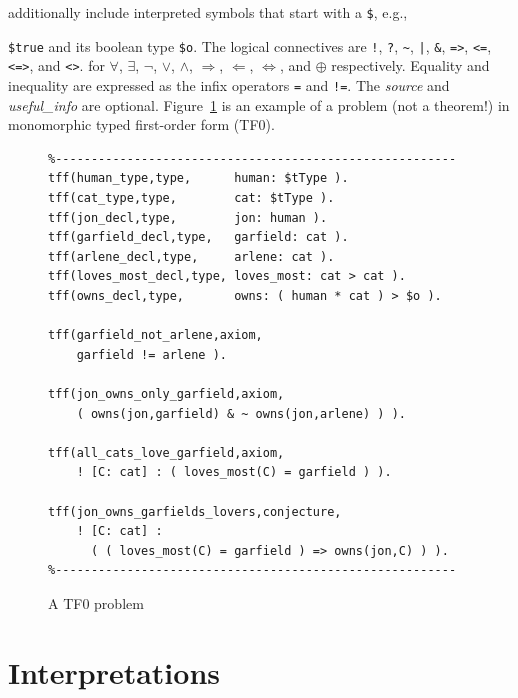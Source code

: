 \documentclass[letterpaper]{article}
\newcommand{\smalltt}[1]{\small \texttt{#1}}
\begin{document}
additionally include interpreted symbols that start with a {\tt \$}, e.g., {\smalltt{\$true} and
its boolean type {\smalltt{\$o}}.
The logical connectives are
{\tt !}, {\tt ?}, {\tt \verb|~|}, {\tt |}, {\tt \&}, {\tt =>}, {\tt <=}, {\tt <=>}, and 
{\tt <{\raisebox{0.4ex}{\texttildelow}}>}.
for
$\forall$, $\exists$, $\neg$, $\vee$, $\wedge$, $\Rightarrow$, $\Leftarrow$, $\Leftrightarrow$, 
and $\oplus$ respectively.
Equality and inequality are expressed as the infix operators {\tt =} and {\tt !=}.
The {\em source} and {\em useful\_info} are optional.
Figure~\ref{TF0FiniteProblem} is an example of a problem (not a theorem!) in monomorphic 
typed first-order form (TF0).  

\begin{figure}[htbp]
\scriptsize
{}
\begin{verbatim}
%--------------------------------------------------------
tff(human_type,type,      human: $tType ).
tff(cat_type,type,        cat: $tType ).
tff(jon_decl,type,        jon: human ).
tff(garfield_decl,type,   garfield: cat ).
tff(arlene_decl,type,     arlene: cat ).
tff(loves_most_decl,type, loves_most: cat > cat ).
tff(owns_decl,type,       owns: ( human * cat ) > $o ).

tff(garfield_not_arlene,axiom,
    garfield != arlene ).

tff(jon_owns_only_garfield,axiom,
    ( owns(jon,garfield) & ~ owns(jon,arlene) ) ).

tff(all_cats_love_garfield,axiom,
    ! [C: cat] : ( loves_most(C) = garfield ) ).

tff(jon_owns_garfields_lovers,conjecture,
    ! [C: cat] : 
      ( ( loves_most(C) = garfield ) => owns(jon,C) ) ).
%--------------------------------------------------------
\end{verbatim}
\caption{A TF0 problem
}
\label{TF0FiniteProblem}
\end{figure}

\section{Interpretations}
\label{Interpretations}

}
\end{document}

